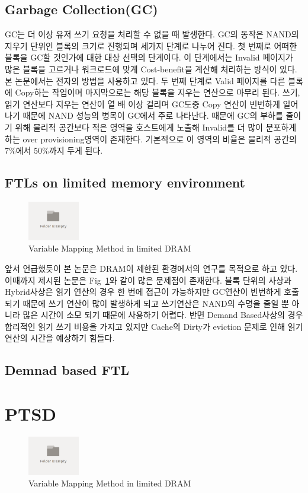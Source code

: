 \documentclass[conference]{IEEEtran}
\begin{document}
\subsection{Garbage Collection(GC)}
GC는 더 이상 유저 쓰기 요청을 처리할 수 없을 때 발생한다. GC의 동작은 NAND의 지우기 단위인 블록의 크기로 진행되며 세가지 단계로 나누어 진다. 첫 번째로 어떠한 블록을 GC할 것인가에 대한 대상 선택의 단계이다. 이 단계에서는 Invalid 페이지가 많은 블록을 고르거나 워크로드에 맞게 Cost-benefit을 계산해 처리하는 방식이 있다. 본 논문에서는 전자의 방법을 사용하고 있다. 두 번째 단계로 Valid 페이지를 다른 블록에 Copy하는 작업이며 마지막으로는 해당 블록을 지우는 연산으로 마무리 된다.
쓰기, 읽기 연산보다 지우는 연산이 열 배 이상 걸리며 GC도중 Copy 연산이 빈번하게 일어나기 때문에 NAND 성능의 병목이 GC에서 주로 나타난다. 때문에 GC의 부하를 줄이기 위해 물리적 공간보다 적은 영역을 호스트에게 노출해 Invalid를 더 많이 분포하게 하는 over provisioning영역이 존재한다. 기본적으로 이 영역의 비율은 물리적 공간의 7\%에서 50\%까지 두게 된다.

\subsection{FTLs on limited memory environment}
\begin{figure}[h]
	\centering
	\includegraphics[width=0.2\textwidth]{image/bg.png}
	\caption{Variable Mapping Method in limited DRAM}
	\label{fig:Map}
\end{figure}
앞서 언급했듯이 본 논문은 DRAM이 제한된 환경에서의 연구를 목적으로 하고 있다. 이때까지 제시된 논문은 Fig~\ref{fig:Map}와 같이 많은 문제점이 존재한다. 블록 단위의 사상과 Hybrid사상은 읽기 연산의 경우 한 번에 접근이 가능하지만 GC연산이 빈번하게 호출되기 때문에 쓰기 연산이 많이 발생하게 되고 쓰기연산은 NAND의 수명을 줄일 뿐 아니라 많은 시간이 소모 되기 때문에 사용하기 어렵다. 반면 Demand Based사상의 경우 합리적인 읽기 쓰기 비용을 가지고 있지만 Cache의 Dirty가 eviction 문제로 인해 읽기 연산의 시간을 예상하기 힘들다.

\subsection{Demnad based FTL}

\section{PTSD}
\begin{figure}[h]
	\centering
	\includegraphics[width=0.2\textwidth]{image/bg.png}
	\caption{Variable Mapping Method in limited DRAM}
	\label{fig:PTSD}
\end{figure}
\end{document}
